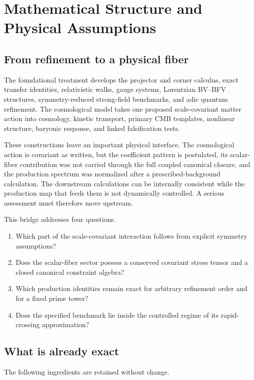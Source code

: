 \chapter{Mathematical Structure and Physical Assumptions}
\label{ch:audit}

\section{From refinement to a physical fiber}

The foundational treatment develops the projector and corner calculus, exact transfer identities, relativistic walks, gauge systems, Lorentzian BV--BFV structures, symmetry-reduced strong-field benchmarks, and adic quantum refinement.  The cosmological model takes one proposed scale-covariant matter action into cosmology, kinetic transport, primary CMB templates, nonlinear structure, baryonic response, and linked falsification tests.

These constructions leave an important physical interface.  The cosmological action is covariant as written, but the coefficient pattern is postulated, its scalar-fiber contribution was not carried through the full coupled canonical closure, and the production spectrum was normalized after a prescribed-background calculation.  The downstream calculations can be internally consistent while the production map that feeds them is not dynamically controlled.  A serious assessment must therefore move upstream.

This bridge addresses four questions.
\begin{enumerate}[leftmargin=2.2em]
\item Which part of the scale-covariant interaction follows from explicit symmetry assumptions?
\item Does the scalar-fiber sector possess a conserved covariant stress tensor and a closed canonical constraint algebra?
\item Which production identities remain exact for arbitrary refinement order and for a fixed prime tower?
\item Does the specified benchmark lie inside the controlled regime of its rapid-crossing approximation?
\end{enumerate}

\section{What is already exact}

The following ingredients are retained without change.

